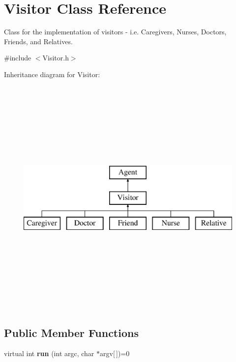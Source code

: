\hypertarget{classVisitor}{\section{Visitor Class Reference}
\label{classVisitor}
}


Class for the implementation of visitors -\/ i.\-e. Caregivers, Nurses, Doctors, Friends, and Relatives.  




{\ttfamily \#include $<$Visitor.\-h$>$}

Inheritance diagram for Visitor\-:\begin{figure}[H]
\begin{center}
\leavevmode
\includegraphics[height=12.000000cm]{classVisitor}
\end{center}
\end{figure}
\subsection*{Public Member Functions}
\begin{DoxyCompactItemize}
\item 
\hypertarget{classVisitor_a39bbfe26aece491b11f47a2d1baca377}{virtual int {\bfseries run} (int argc, char $\ast$argv\mbox{[}$\,$\mbox{]})=0}\label{classVisitor_a39bbfe26aece491b11f47a2d1baca377}

\end{DoxyCompactItemize}

